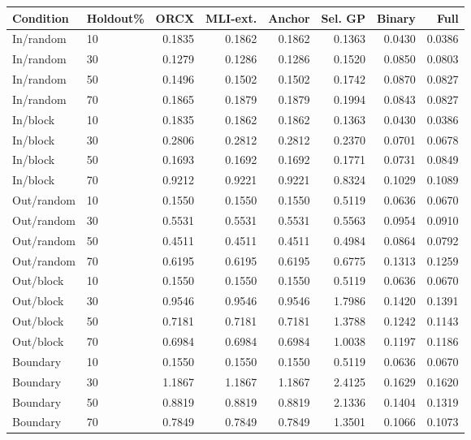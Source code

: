 \begin{tabular}{llrrrrrr}
\toprule
Condition & Holdout\% & ORCX & MLI-ext. & Anchor & Sel. GP & Binary & Full \\
\midrule
In/random & 10 & 0.1835 & 0.1862 & 0.1862 & 0.1363 & 0.0430 & 0.0386 \\
In/random & 30 & 0.1279 & 0.1286 & 0.1286 & 0.1520 & 0.0850 & 0.0803 \\
In/random & 50 & 0.1496 & 0.1502 & 0.1502 & 0.1742 & 0.0870 & 0.0827 \\
In/random & 70 & 0.1865 & 0.1879 & 0.1879 & 0.1994 & 0.0843 & 0.0827 \\
In/block & 10 & 0.1835 & 0.1862 & 0.1862 & 0.1363 & 0.0430 & 0.0386 \\
In/block & 30 & 0.2806 & 0.2812 & 0.2812 & 0.2370 & 0.0701 & 0.0678 \\
In/block & 50 & 0.1693 & 0.1692 & 0.1692 & 0.1771 & 0.0731 & 0.0849 \\
In/block & 70 & 0.9212 & 0.9221 & 0.9221 & 0.8324 & 0.1029 & 0.1089 \\
Out/random & 10 & 0.1550 & 0.1550 & 0.1550 & 0.5119 & 0.0636 & 0.0670 \\
Out/random & 30 & 0.5531 & 0.5531 & 0.5531 & 0.5563 & 0.0954 & 0.0910 \\
Out/random & 50 & 0.4511 & 0.4511 & 0.4511 & 0.4984 & 0.0864 & 0.0792 \\
Out/random & 70 & 0.6195 & 0.6195 & 0.6195 & 0.6775 & 0.1313 & 0.1259 \\
Out/block & 10 & 0.1550 & 0.1550 & 0.1550 & 0.5119 & 0.0636 & 0.0670 \\
Out/block & 30 & 0.9546 & 0.9546 & 0.9546 & 1.7986 & 0.1420 & 0.1391 \\
Out/block & 50 & 0.7181 & 0.7181 & 0.7181 & 1.3788 & 0.1242 & 0.1143 \\
Out/block & 70 & 0.6984 & 0.6984 & 0.6984 & 1.0038 & 0.1197 & 0.1186 \\
Boundary & 10 & 0.1550 & 0.1550 & 0.1550 & 0.5119 & 0.0636 & 0.0670 \\
Boundary & 30 & 1.1867 & 1.1867 & 1.1867 & 2.4125 & 0.1629 & 0.1620 \\
Boundary & 50 & 0.8819 & 0.8819 & 0.8819 & 2.1336 & 0.1404 & 0.1319 \\
Boundary & 70 & 0.7849 & 0.7849 & 0.7849 & 1.3501 & 0.1066 & 0.1073 \\
\bottomrule
\end{tabular}
